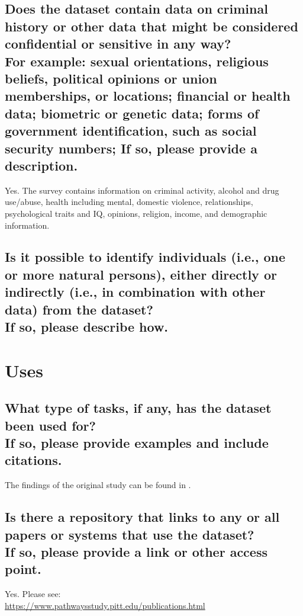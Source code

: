\documentclass[letterpaper, 10 pt, conference]{ieeeconf}  %
\newcommand{\subtitle}[1]{{\\ \small \normalfont \color{purple} #1}}
\begin{document}
\subsection{Does the dataset contain data on criminal history or other data that might be considered confidential or sensitive in any way? \subtitle{For example: sexual orientations, religious beliefs, political opinions or union memberships, or locations; financial or health data; biometric or genetic data; forms of government identification, such as social security numbers; If so, please provide a description.}}

Yes. The survey contains information on criminal activity, alcohol and drug use/abuse, health including mental, domestic violence, relationships, psychological traits and IQ, opinions, religion, income, and demographic information. 

\subsection{Is it possible to identify individuals (i.e., one or more natural persons), either directly or indirectly (i.e., in combination with other data) from the dataset? \subtitle{If so, please describe how.}}

\section{Uses}

\subsection{What type of tasks, if any, has the dataset been used for? \subtitle{If so, please provide examples and include citations.}}

The findings of the original study can be found in \cite{pathways_report,pathwaysarticle,pathwaysarticle2}. 

\subsection{Is there a repository that links to any or all papers or systems that use the dataset? \subtitle{If so, please provide a link or other access point. }}

Yes. Please see:\\

\href{https://www.pathwaysstudy.pitt.edu/publications.html}{https://www.pathwaysstudy.pitt.edu/publications.html} \\
\end{document}
